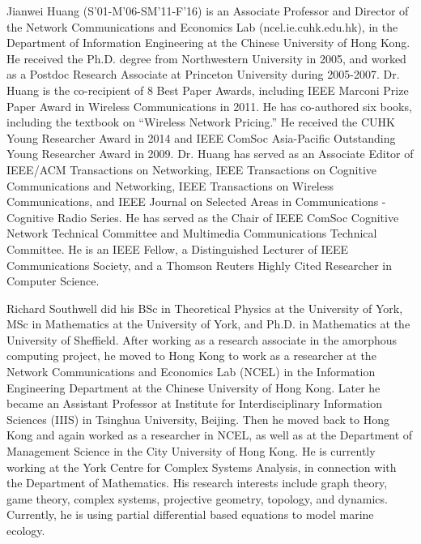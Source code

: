 \documentclass[journal]{IEEEtran}
\begin{document}
\begin{IEEEbiography}
{Jianwei Huang} (S'01-M'06-SM'11-F'16) is an Associate Professor and Director of the Network Communications and Economics Lab (ncel.ie.cuhk.edu.hk), in the Department of Information Engineering at the Chinese University of Hong Kong. He received the Ph.D. degree from Northwestern University in 2005, and worked as a Postdoc Research Associate at Princeton University during 2005-2007. Dr. Huang is the co-recipient of 8 Best Paper Awards, including IEEE Marconi Prize Paper Award in Wireless Communications in 2011. He has co-authored six books, including the textbook on ``Wireless Network Pricing.'' He received the CUHK Young Researcher Award in 2014 and IEEE ComSoc Asia-Pacific Outstanding Young Researcher Award in 2009. Dr. Huang has served as an Associate Editor of IEEE/ACM Transactions on Networking, IEEE Transactions on Cognitive Communications and Networking, IEEE Transactions on Wireless Communications, and IEEE Journal on Selected Areas in Communications - Cognitive Radio Series. He has served as the Chair of IEEE ComSoc Cognitive Network Technical Committee and Multimedia Communications Technical Committee. He is an IEEE Fellow, a Distinguished Lecturer of IEEE Communications Society, and a Thomson Reuters Highly Cited Researcher in Computer Science.
\end{IEEEbiography}

\begin{IEEEbiography}
{Richard Southwell} did his BSc in Theoretical Physics at the University of York, MSc in Mathematics at the University of York, and Ph.D. in Mathematics at the University of Sheffield. After working as a research associate in the amorphous computing project, he moved to Hong Kong to work as a researcher at the Network Communications and Economics Lab (NCEL) in the Information Engineering Department at the Chinese University of Hong Kong. Later he became an Assistant Professor at Institute for Interdisciplinary Information Sciences (IIIS) in Tsinghua University, Beijing. Then he moved back to Hong Kong and again worked as a researcher in NCEL, as well as at the Department of Management Science in the City University of Hong Kong. He is currently working at the York Centre for Complex Systems Analysis, in connection with the Department of Mathematics. His research interests include graph theory, game theory, complex systems, projective geometry, topology, and dynamics. Currently, he is using partial differential based equations to model marine ecology.
\end{IEEEbiography}





\end{document}
